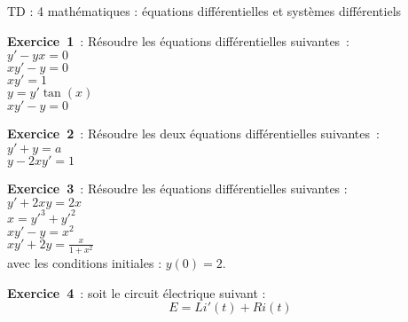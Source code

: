 \documentclass[12pt, a4paper]{article}
\begin{document}
\begin{center}
\large\sc 

TD : 4 mathématiques : équations différentielles et systèmes différentiels
\end{center}

{\bf Exercice~1}~: Résoudre les équations différentielles suivantes~:
\\
$y'-yx=0$\\
$xy'-y=0$\\
$xy'=1$\\
$y=y'\tan(x)$\\
$xy'-y=0$

{\bf Exercice~2}~: Résoudre les deux équations différentielles suivantes~:
\\
$y'+y=a$\\
$y-2xy'=1$


{\bf Exercice~3}~: Résoudre les équations différentielles suivantes :
\\
$ y'+2xy=2x $ \\
$ x=y'^3+y'^2 $ \\
$ xy'- y = x^2 $ \\
$ xy' + 2y = \frac{x}{1+x^2}$ \\
avec les conditions initiales : $y(0) = 2$. 


{\bf Exercice~4}~: soit le circuit électrique suivant :
\begin{equation*}
E = Li'(t)+Ri(t)
\end{equation*}
\end{document}
